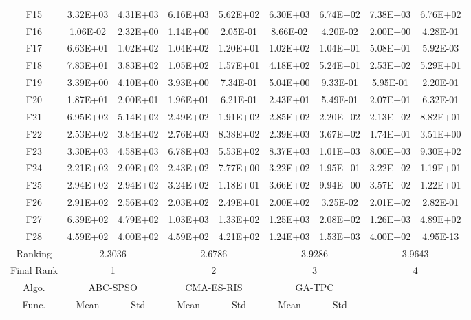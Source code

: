 \begin{table*}[htbp]
\begin{tabular}{|c|cc|cc|cc|cc|}
    F15   & 3.32E+03 & 4.31E+03 & 6.16E+03 & 5.62E+02 & 6.30E+03 & 6.74E+02 & 7.38E+03 & 6.76E+02 \\
    F16   & 1.06E-02 & 2.32E+00 & 1.14E+00 & 2.05E-01 & 8.66E-02 & 4.20E-02 & 2.00E+00 & 4.28E-01 \\
    F17   & 6.63E+01 & 1.02E+02 & 1.04E+02 & 1.20E+01 & 1.02E+02 & 1.04E+01 & 5.08E+01 & 5.92E-03 \\
    F18   & 7.83E+01 & 3.83E+02 & 1.05E+02 & 1.57E+01 & 4.18E+02 & 5.24E+01 & 2.53E+02 & 5.29E+01 \\
    F19   & 3.39E+00 & 4.10E+00 & 3.93E+00 & 7.34E-01 & 5.04E+00 & 9.33E-01 & 5.95E-01 & 2.20E-01 \\
    F20   & 1.87E+01 & 2.00E+01 & 1.96E+01 & 6.21E-01 & 2.43E+01 & 5.49E-01 & 2.07E+01 & 6.32E-01 \\
    \hline
    F21   & 6.95E+02 & 5.14E+02 & 2.49E+02 & 1.91E+02 & 2.85E+02 & 2.20E+02 & 2.13E+02 & 8.82E+01 \\
    F22   & 2.53E+02 & 3.84E+02 & 2.76E+03 & 8.38E+02 & 2.39E+03 & 3.67E+02 & 1.74E+01 & 3.51E+00 \\
    F23   & 3.30E+03 & 4.58E+03 & 6.78E+03 & 5.53E+02 & 8.37E+03 & 1.01E+03 & 8.00E+03 & 9.30E+02 \\
    F24   & 2.21E+02 & 2.09E+02 & 2.43E+02 & 7.77E+00 & 3.22E+02 & 1.95E+01 & 3.22E+02 & 1.19E+01 \\
    F25   & 2.94E+02 & 2.94E+02 & 3.24E+02 & 1.18E+01 & 3.66E+02 & 9.94E+00 & 3.57E+02 & 1.22E+01 \\
    F26   & 2.91E+02 & 2.56E+02 & 2.03E+02 & 2.49E+01 & 2.00E+02 & 3.25E-02 & 2.01E+02 & 2.82E-01 \\
    F27   & 6.39E+02 & 4.79E+02 & 1.03E+03 & 1.33E+02 & 1.25E+03 & 2.08E+02 & 1.26E+03 & 4.89E+02 \\
    F28   & 4.59E+02 & 4.00E+02 & 4.59E+02 & 4.21E+02 & 1.24E+03 & 1.53E+03 & 4.00E+02 & 4.95E-13 \\
   \hline
    Ranking & \multicolumn{2}{c|}{2.3036} & \multicolumn{2}{c|}{2.6786} & \multicolumn{2}{c|}{3.9286} & \multicolumn{2}{c|}{3.9643} \\
    \hline
    Final Rank & \multicolumn{2}{c|}{1} & \multicolumn{2}{c|}{2} & \multicolumn{2}{c|}{3} & \multicolumn{2}{c|}{4} \\
    \hline
    \cline{1-7}
    Algo. & \multicolumn{2}{c|}{ABC-SPSO} & \multicolumn{2}{c|}{CMA-ES-RIS} & \multicolumn{2}{c|}{GA-TPC}   \\
    \cline{1-7}
    Func. & Mean  & Std   & Mean  & Std   & Mean  & Std    \\

\end{tabular}
\end{table*}
